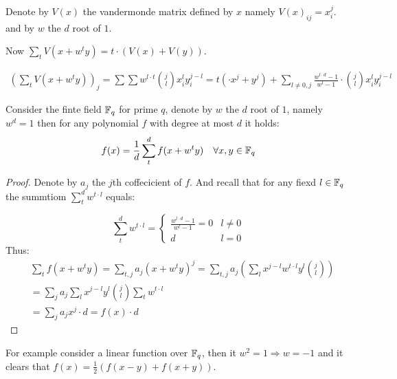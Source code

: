Denote by $V(x)$ the vandermonde matrix defined by $x$ namely $V(x)_{ij} = x_{i}^{j}$. and by $w$ the $d$ root of $1$. 


\begin{claim} 
  \label{claim:van }
Now $\sum_{t}{ V\left( x +  w^{t}y \right)  } = t \cdot \left(V(x) + V(y) \right)$.   
\end{claim}

\begin{equation*}
  \begin{split}
  \left(\sum_{t}V(x + w^{t}y)\right)_{j} = \sum{ \sum w^{l\cdot t} { j \choose l }x_{i}^{l}y_{i}^{j - l}   } = t \left( \cdot x^{j} + y^{j}\right) + \sum_{l\neq 0,j}{\frac{w^{l\cdot d} - 1 }{w^{l}-1}\cdot {j \choose l}x_{i}^{l}y_{i}^{j-l}}
  \end{split}
\end{equation*}

\begin{claim}
  Consider the finte field $\mathbb{F}_{q}$ for prime $q$, denote by $w$ the $d$ root of $1$, namely $w^{d}  = 1$ then for any polynomial $f$ with degree at most $d$ it holds:   
  \begin{equation}
    \label{eq:poly}
    f(x) = \frac{1}{d} \sum_{t}^{d}{f( x + w^{t}y)}  \ \ \ \forall x,y \in \mathbb{F}_{q}
  \end{equation} 
\end{claim}
\begin{proof}
  Denote by $a_{j}$ the $j$th coffecicient of $f$. And recall that for any fiexd $l \in \mathbb{F}_{q}$ the summtiom $ \sum_{t}^{d}w^{t\cdot l}$ equals: 

  \begin{equation*}
    \sum_{t}^{d}w^{t\cdot l} = \begin{cases}
      \frac{w^{l \cdot d} - 1}{ w^{l} - 1 } = 0  & l \neq 0 \\
      d   & l = 0
    \end{cases}
  \end{equation*}
Thus:  
  \begin{equation*}
    \begin{split}
  &  \sum_{t}{ f\left( x + w^{t}y \right)  } = \sum_{t,j}{a_{j}\left( x + w^{t}y \right)^{j}}  =  \sum_{t,j}{ a_{j} \left( \sum_{l} x^{j-l} w^{t\cdot l}y^{l} { j \choose l} \right)} \\
  & =  \sum_{j}{ a_{j} \sum_{l} x^{j-l} y^{l} { j \choose l} \sum_{t} w^{t\cdot l} } \\
  & = \sum_{j}{ a_{j}  x^{j} \cdot d } = f(x) \cdot d  
    \end{split}
  \end{equation*}
\end{proof}
For example consider a linear function over $\mathbb{F}_{q}$, then it $w^2 = 1 \Rightarrow w = -1 $ and it clears that $f(x) = \frac{1}{2} \left( f(x - y) + f(x + y) \right)$.

